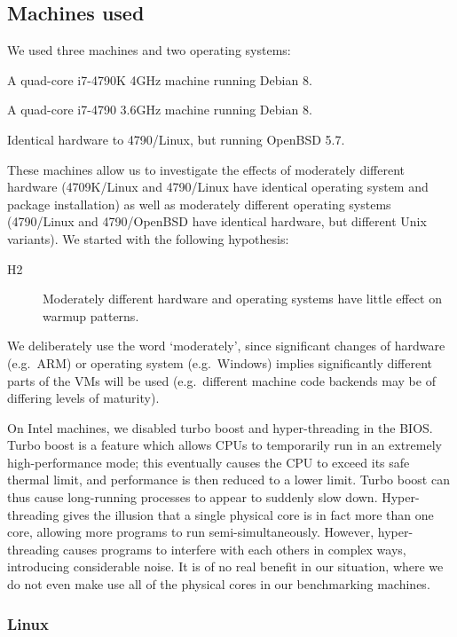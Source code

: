 \documentclass[10pt,preprint]{sigplanconf}
\newcommand{\hyptwo}{H2\xspace}
\newcommand{\bencherthree}{4709K/Linux\xspace}
\newcommand{\bencherfive}{4790/Linux\xspace}
\newcommand{\benchersix}{4790/OpenBSD\xspace}
\begin{document}
\subsection{Machines used}

We used three machines and two operating systems:
\begin{description*}
  \item[\bencherthree] A quad-core i7-4790K 4GHz machine running Debian 8.
  \item[\bencherfive] A quad-core i7-4790 3.6GHz machine running Debian 8.
  \item[\benchersix] Identical hardware to \bencherfive, but running OpenBSD 5.7.
\end{description*}
These machines allow us to investigate the effects of moderately different
hardware (\bencherthree and \bencherfive have identical operating system and
package installation) as well as moderately different operating systems
(\bencherfive and \benchersix have identical hardware, but different Unix
variants). We started with the following hypothesis:
\begin{description}
  \item[\hyptwo] Moderately different hardware and operating systems have little effect on warmup patterns.
\end{description}
We deliberately use the word `moderately', since significant changes of hardware
(e.g.~ARM) or operating system (e.g.~Windows) implies significantly different
parts of the VMs will be used (e.g.~different machine code backends may be of
differing levels of maturity).

On Intel machines, we disabled turbo boost and hyper-threading in the BIOS. Turbo boost is a
feature which allows CPUs to temporarily run in an extremely high-performance
mode; this eventually causes the CPU to exceed its safe thermal limit, and
performance is then reduced to a lower limit. Turbo boost can thus cause long-running processes to
appear to suddenly slow down. Hyper-threading gives the illusion that a single
physical core is in fact more than one core, allowing more programs to
run semi-simultaneously. However, hyper-threading causes programs to interfere
with each others in complex ways, introducing considerable noise. It is of
no real benefit in our situation, where we do not even make use all of the
physical cores in our benchmarking machines.


\subsubsection{Linux}
\end{document}
